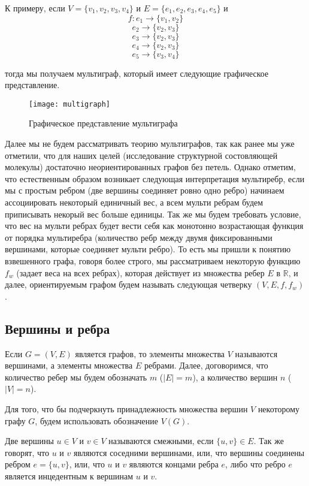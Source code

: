 \documentclass{article}
\begin{document}
К примеру, если $V = \{ v_1, v_2, v_3, v_4 \}$ и $E = \{ e_1, e_2, e_3, e_4, e_5 \}$ и
$$ f: e_1 \rightarrow \{ v_1, v_2 \} $$
$$ e_2 \rightarrow \{ v_2, v_3 \} $$
$$ e_3 \rightarrow \{ v_2, v_3 \} $$
$$ e_4 \rightarrow \{ v_2, v_3 \} $$
$$ e_5 \rightarrow \{ v_3, v_4 \} $$

тогда мы получаем мультиграф, который имеет следующие графическое представление.

\begin{figure}[h]
\texttt{[image: multigraph]}
\centering
\caption{Графическое представление мультиграфа}
\end{figure}

\newpage

Далее мы не будем рассматривать теорию мультиграфов, так как ранее мы уже отметили, что для наших целей (исследование структурной состовляющей молекулы) достаточно неориентированных графов без петель. Однако отметим, что естественным образом возникает следующая интерпретация мультиребр, если мы с простым ребром (две вершины соединяет ровно одно ребро) начинаем ассоциировать некоторый единичный вес, а всем мульти ребрам будем приписывать некорый вес больше единицы. Так же мы будем требовать условие, что вес на мульти ребрах будет вести себя как монотонно возрастающая функция от порядка мультиребра (количество ребр между двумя фиксированными вершинами, которые соединяет мульти ребро). То есть мы пришли к понятию взвешенного графа, говоря более строго, мы рассматриваем некоторую функцию $f_w$ (задает веса на всех ребрах), которая действует из множества ребер $E$ в $\mathbb{R}$, и далее, ориентируемым графом будем называть следующая четверку $(V, E, f, f_w)$.

\subsection{Вершины и ребра}

Если $G=(V, E)$ является графов, то элементы множества $V$ называются вершинами, а элементы множества $E$ ребрами. Далее, договоримся, что количество ребер мы будем обозначать $m$ ($|E| = m$), а количество вершин $n$ ($|V| = n$).

Для того, что бы подчеркнуть принадлежность множества вершин $V$ некоторому графу $G$, будем использовать обозначение $V(G)$.

Две вершины $u \in V$ и $v \in V$ называются смежными, если $\{u, v\} \in E$. Так же говорят, что $u$ и $v$ являются соседними вершинами, или, что вершины соединены ребром $e=\{ u, v \}$, или, что $u$ и $v$ являются концами ребра $e$, либо что ребро $e$ является инцедентным к вершинам $u$ и $v$. 
\end{document}
